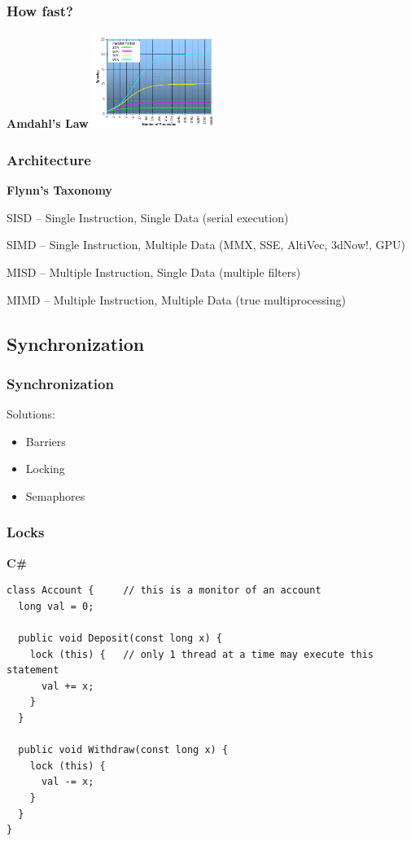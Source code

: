 \documentclass{beamer}
\begin{document}
\begin{frame}
\frametitle{How fast?}
\begin{center}
  \textbf{Amdahl's Law}
  \includegraphics[width=0.3\textwidth]{img/amdahl2.png} 
\end{center}
\end{frame}

\begin{frame}
\frametitle{Architecture}
\textbf{Flynn's Taxonomy}

SISD -- Single Instruction, Single Data
(serial execution)

SIMD -- Single Instruction, Multiple Data
(MMX, SSE, AltiVec, 3dNow!, GPU)

MISD -- Multiple Instruction, Single Data 
(multiple filters)

MIMD -- Multiple Instruction, Multiple Data
(true multiprocessing)
\end{frame}

\subsection{Synchronization}
\begin{frame}
\frametitle{Synchronization}

\pause
Solutions:
\begin{itemize}
  \item Barriers
  \item Locking
  \item Semaphores
\end{itemize}

\end{frame}


\begin{frame}[fragile]
\frametitle{Locks}
\textbf{C\#}
\begin{verbatim}
class Account {     // this is a monitor of an account
  long val = 0;
 
  public void Deposit(const long x) {
    lock (this) {   // only 1 thread at a time may execute this statement
      val += x;
    }
  }
 
  public void Withdraw(const long x) {
    lock (this) {
      val -= x;
    }
  }
}
\end{verbatim}
\end{frame}
\end{document}
